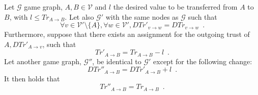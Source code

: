 \begin{theorem}
\label{riskinv}
   Let $\mathcal{G}$ game graph, $A, B \in \mathcal{V}$ and $l$ the desired value to be transferred from $A$ to $B$,
   with $l \leq Tr_{A \rightarrow B}$. Let also $\mathcal{G}'$ with the same nodes as $\mathcal{G}$ such that
   \begin{equation*}
      \forall v \in \mathcal{V}' \setminus \{A\}, \forall w \in \mathcal{V}', DTr'_{v \rightarrow w} =
      DTr_{v \rightarrow w} \enspace.
   \end{equation*}
   Furthermore, suppose that there exists an assignment for the outgoing trust of $A, DTr'_{A \rightarrow v}$, such that
   \begin{equation}
   \label{primetrust}
      Tr'_{A \rightarrow B} = Tr_{A \rightarrow B} - l \enspace.
   \end{equation}
   Let another game graph, $\mathcal{G}''$, be identical to $\mathcal{G}'$ except for the following change:
   \begin{equation*}
      DTr''_{A \rightarrow B} = DTr'_{A \rightarrow B} + l \enspace.
   \end{equation*}
   It then holds that
   \begin{equation*}
      Tr''_{A \rightarrow B} = Tr_{A \rightarrow B} \enspace.
   \end{equation*}
\end{theorem}
